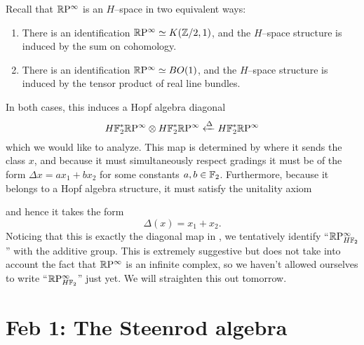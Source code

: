 \begin{example}\label{RPExampleFaulty}
Recall that $\mathbb R\mathrm P^\infty$ is an $H$--space in two equivalent ways:
\begin{enumerate}
\item There is an identification $\mathbb R\mathrm P^\infty \simeq K(\mathbb Z/2, 1)$, and the $H$--space structure is induced by the sum on cohomology.
\item There is an identification $\mathbb R\mathrm P^\infty \simeq BO(1)$, and the $H$--space structure is induced by the tensor product of real line bundles.
\end{enumerate}
In both cases, this induces a Hopf algebra diagonal \[H\mathbb F_2^* \mathbb R\mathrm P^\infty \otimes H\mathbb F_2^* \mathbb R\mathrm P^\infty \xleftarrow\Delta H\mathbb F_2^* \mathbb R\mathrm P^\infty\] which we would like to analyze.  This map is determined by where it sends the class $x$, and because it must simultaneously respect gradings it must be of the form $\Delta x = ax_1 + bx_2$ for some constants $a, b \in \mathbb F_2$.  Furthermore, because it belongs to a Hopf algebra structure, it must satisfy the unitality axiom
\begin{center}
\end{center}
and hence it takes the form \[\Delta(x) = x_1 + x_2.\]  Noticing that this is exactly the diagonal map in , we tentatively identify ``$\mathbb R\mathrm P^\infty_{H\mathbb F_2}$'' with the additive group.  This is extremely suggestive but does not take into account the fact that $\mathbb R\mathrm P^\infty$ is an infinite complex, so we haven't allowed ourselves to write ``$\mathbb R\mathrm P^\infty_{H\mathbb F_2}$'' just yet.  We will straighten this out tomorrow.
\end{example}








\section{Feb 1: The Steenrod algebra}
\label{TheSteenrodAlgebraSection}


